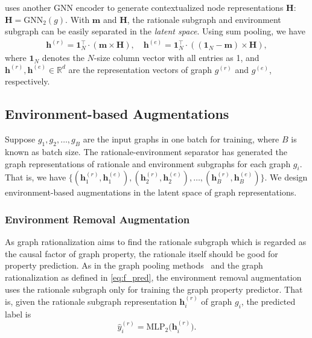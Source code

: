 \documentclass[sigconf]{acmart}
\begin{document}
\method uses another GNN encoder to generate contextualized node representations $\mathbf{H}$: $\mathbf{H} = \text{GNN}_2(g)$.
With $\mathbf{m}$ and $\mathbf{H}$, the rationale subgraph and environment subgraph can be easily separated in the \emph{latent space}. Using sum pooling, we have 
\begin{align}
    \label{eq:h_r}
    \mathbf{h}^{(r)} = \mathbf{1}^{\top}_N \cdot (\mathbf{m} \times \mathbf{H}), \quad
\mathbf{h}^{(e)} = \mathbf{1}^{\top}_N \cdot ((\mathbf{1}_N - \mathbf{m}) \times \mathbf{H}),
\end{align}
where $\mathbf{1}_N$ denotes the $N$-size column vector with all entries as 1, and $\mathbf{h}^{(r)},\mathbf{h}^{(e)} \in \mathbb{R}^{d}$ are the representation vectors of graph $g^{(r)}$ and $g^{(e)}$, respectively.

\subsection{Environment-based Augmentations}
\label{sec:env_aug}

Suppose $g_1, g_2, \dots, g_B$ are the input graphs in one batch for training, where $B$ is known as batch size.
The rationale-environment separator has generated the graph representations of rationale and environment subgraphs for each graph $g_i$. That is, we have
$\{(\mathbf{h}_1^{(r)}, \mathbf{h}_1^{(e)}), (\mathbf{h}_2^{(r)}, \mathbf{h}_2^{(e)}), \dots, (\mathbf{h}_B^{(r)}, \mathbf{h}_B^{(e)})\}$. We design environment-based augmentations in the latent space of graph representations.

\subsubsection{Environment Removal Augmentation} 
As graph rationalization aims to find the rationale subgraph which is regarded as the causal factor of graph property, the rationale itself should be good for property prediction. As in the graph pooling methods~\cite{lee2019self,gao2021graph} and the graph rationalization as defined in \cref{eq:f_pred}, the environment removal augmentation uses the rationale subgraph only for training the graph property predictor. That is, given the rationale subgraph representation $\mathbf{h}_i^{(r)}$ of graph $g_i$, the predicted label is
\begin{equation}
\label{eq:mlp2_rem}
\hat{y}_{i}^{(r)} = \text{MLP}_2 \big(\mathbf{h}_i^{(r)}\big).
\end{equation}
\end{document}
